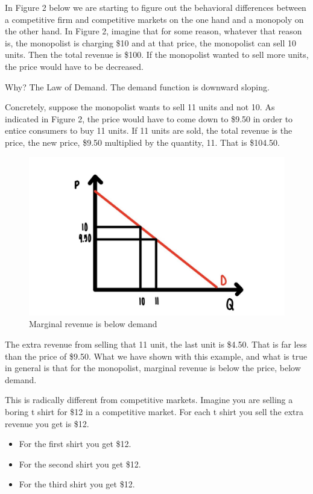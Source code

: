 \documentclass[
]{book}
\providecommand{\tightlist}{%
  \setlength{\itemsep}{0pt}\setlength{\parskip}{0pt}}
\begin{document}
In Figure 2 below we are starting to figure out the behavioral differences between a competitive firm and competitive markets on the one hand and a monopoly on the other hand. In Figure 2, imagine that for some reason, whatever that reason is, the monopolist is charging \$10 and at that price, the monopolist can sell 10 units. Then the total revenue is \$100. If the monopolist wanted to sell more units, the price would have to be decreased.

Why? The Law of Demand. The demand function is downward sloping.

Concretely, suppose the monopolist wants to sell 11 units and not 10. As indicated in Figure 2, the price would have to come down to \$9.50 in order to entice consumers to buy 11 units. If 11 units are sold, the total revenue is the price, the new price, \$9.50 multiplied by the quantity, 11. That is \$104.50.

\begin{figure}

{\centering \includegraphics[width=0.75\linewidth]{img/ch6/fig2} 

}

\caption{Marginal revenue is below demand}\label{fig:fig602}
\end{figure}

The extra revenue from selling that 11 unit, the last unit is \$4.50. That is far less than the price of \$9.50.
What we have shown with this example, and what is true in general is that for the monopolist, marginal revenue is below the price, below demand.

This is radically different from competitive markets. Imagine you are selling a boring t shirt for \$12 in a competitive market. For each t shirt you sell the extra revenue you get is \$12.

\begin{itemize}
\tightlist
\item
  For the first shirt you get \$12.
\item
  For the second shirt you get \$12.
\item
  For the third shirt you get \$12.
\end{itemize}
\end{document}

